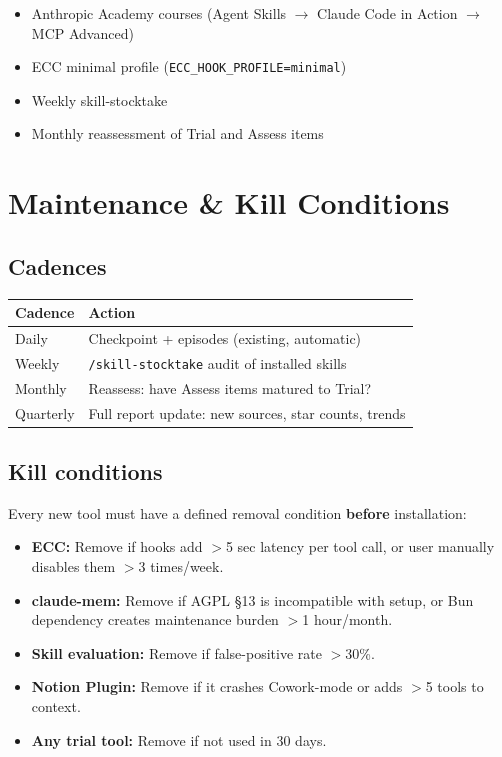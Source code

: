 \documentclass[11pt,a4paper]{article}
\begin{document}
\begin{itemize}
  \item Anthropic Academy courses (Agent Skills $\rightarrow$ Claude Code in Action $\rightarrow$ MCP Advanced)
  \item ECC minimal profile (\texttt{ECC\_HOOK\_PROFILE=minimal})
  \item Weekly skill-stocktake
  \item Monthly reassessment of Trial and Assess items
\end{itemize}

\newpage

\section{Maintenance \& Kill Conditions}

\subsection{Cadences}

\begin{tabularx}{\textwidth}{l X}
\toprule
\textbf{Cadence} & \textbf{Action} \\
\midrule
Daily & Checkpoint + episodes (existing, automatic) \\
Weekly & \texttt{/skill-stocktake} audit of installed skills \\
Monthly & Reassess: have Assess items matured to Trial? \\
Quarterly & Full report update: new sources, star counts, trends \\
\bottomrule
\end{tabularx}

\subsection{Kill conditions}

Every new tool must have a defined removal condition \textbf{before} installation:

\begin{itemize}
  \item \textbf{ECC:} Remove if hooks add $>$5 sec latency per tool call, or user manually disables them $>$3 times/week.
  \item \textbf{claude-mem:} Remove if AGPL \S 13 is incompatible with setup, or Bun dependency creates maintenance burden $>$1 hour/month.
  \item \textbf{Skill evaluation:} Remove if false-positive rate $>$30\%.
  \item \textbf{Notion Plugin:} Remove if it crashes Cowork-mode or adds $>$5 tools to context.
  \item \textbf{Any trial tool:} Remove if not used in 30 days.
\end{itemize}
\end{document}
